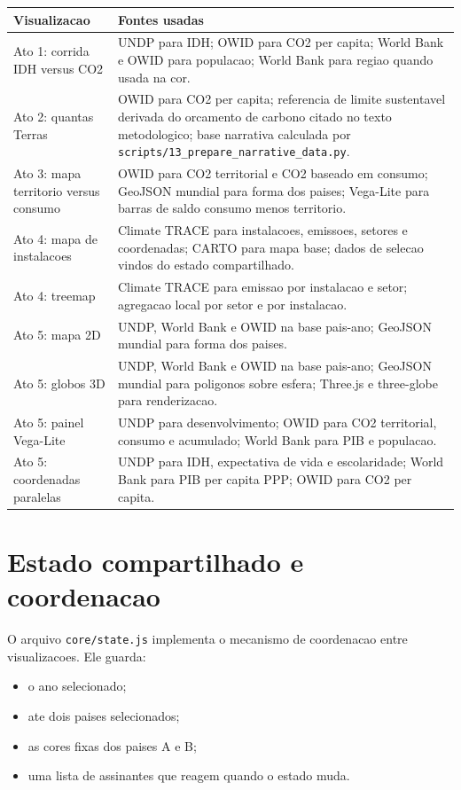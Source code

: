 \documentclass[12pt,a4paper]{article}
\begin{document}
\begin{longtable}{>{\raggedright\arraybackslash}p{4.1cm}>{\raggedright\arraybackslash}p{9.9cm}}
\toprule
\textbf{Visualizacao} & \textbf{Fontes usadas} \\
\midrule
Ato 1: corrida IDH versus CO2 & UNDP para IDH; OWID para CO2 per capita; World Bank e OWID para populacao; World Bank para regiao quando usada na cor. \\
Ato 2: quantas Terras & OWID para CO2 per capita; referencia de limite sustentavel derivada do orcamento de carbono citado no texto metodologico; base narrativa calculada por \texttt{scripts/13\_prepare\_narrative\_data.py}. \\
Ato 3: mapa territorio versus consumo & OWID para CO2 territorial e CO2 baseado em consumo; GeoJSON mundial para forma dos paises; Vega-Lite para barras de saldo consumo menos territorio. \\
Ato 4: mapa de instalacoes & Climate TRACE para instalacoes, emissoes, setores e coordenadas; CARTO para mapa base; dados de selecao vindos do estado compartilhado. \\
Ato 4: treemap & Climate TRACE para emissao por instalacao e setor; agregacao local por setor e por instalacao. \\
Ato 5: mapa 2D & UNDP, World Bank e OWID na base pais-ano; GeoJSON mundial para forma dos paises. \\
Ato 5: globos 3D & UNDP, World Bank e OWID na base pais-ano; GeoJSON mundial para poligonos sobre esfera; Three.js e three-globe para renderizacao. \\
Ato 5: painel Vega-Lite & UNDP para desenvolvimento; OWID para CO2 territorial, consumo e acumulado; World Bank para PIB e populacao. \\
Ato 5: coordenadas paralelas & UNDP para IDH, expectativa de vida e escolaridade; World Bank para PIB per capita PPP; OWID para CO2 per capita. \\
\bottomrule
\end{longtable}

\section{Estado compartilhado e coordenacao}

O arquivo \texttt{core/state.js} implementa o mecanismo de coordenacao entre visualizacoes. Ele guarda:

\begin{itemize}
  \item o ano selecionado;
  \item ate dois paises selecionados;
  \item as cores fixas dos paises A e B;
  \item uma lista de assinantes que reagem quando o estado muda.
\end{itemize}
\end{document}
